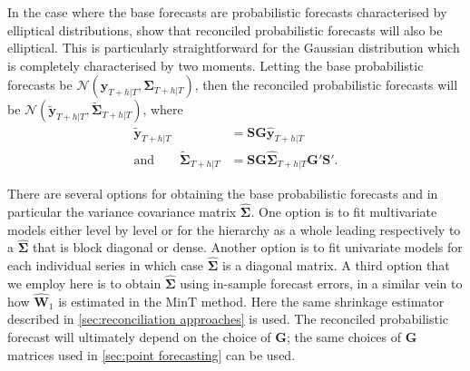 \documentclass[graybox]{svmult}
\begin{document}

In the case where the base forecasts are probabilistic forecasts characterised by elliptical distributions, \citet{GamEtAl2018} show that reconciled probabilistic forecasts will also be elliptical. This is particularly straightforward for the Gaussian distribution which is completely characterised by two moments. Letting the base probabilistic forecasts be $\mathscr{N}(\bm{\hat{y}}_{T+h|T}, \hat{\bm{\Sigma}}_{T+h|T})$, then the reconciled probabilistic forecasts will be $\mathscr{N}(\bm{\tilde{y}}_{T+h|T}, \tilde{\bm{\Sigma}}_{T+h|T})$, where
\begin{align}\label{eq:rec mean}
	\bm{\tilde{y}}_{T+h|T} &= \bm{S}\bm{G}\bm{\hat{y}}_{T+h|T} \\
\text{and}\qquad\label{eq:rec var}
	\tilde{\bm{\Sigma}}_{T+h|T} &= \bm{S}\bm{G}\hat{\bm{\Sigma}}_{T+h|T}\bm{G}'\bm{S}'.
\end{align}

There are several options for obtaining the base probabilistic forecasts and in particular the variance covariance matrix $\hat{\bm{\Sigma}}$. One option is to fit multivariate models either level by level or for the hierarchy as a whole leading respectively to a $\hat{\bm \Sigma}$ that is block diagonal or dense. Another option is to fit univariate models for each individual series in which case $\hat{\bm{\Sigma}}$ is a diagonal matrix. A third option that we employ here is to obtain $\hat{\bm{\Sigma}}$ using in-sample forecast errors, in a similar vein to how $\hat{\bm{W}}_{1}$ is estimated in the MinT method. Here the same shrinkage estimator described in \autoref{sec:reconciliation approaches} is used. The reconciled probabilistic forecast will ultimately depend on the choice of $\bm{G}$; the same choices of $\bm{G}$ matrices used in \autoref{sec:point forecasting} can be used.
\end{document}
